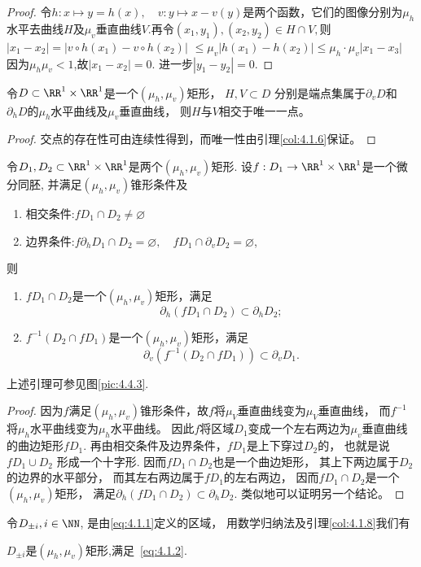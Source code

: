 \begin{proof}
  令$h:x \mapsto y=h(x), \quad v: y \mapsto x-v(y)$是两个函数，它们的图像分别为$\mu_h$水平去曲线$H$及$\mu_v$垂直曲线$V$.再令$(x_1,y_1),(x_2,y_2)\in H \cap V,$则
  $\left|x_{1}-x_{2}\right|=\left|v \circ h\left(x_{1}\right)-v \circ h\left(x_{2}\right)\right|$
  $\leqslant \mu_{v}\left|h\left(x_{1}\right)-h\left(x_{2}\right)\right| \leqslant \mu_{h} \cdot \mu_{v}\left|x_{1}-x_{3}\right|$
  因为$\mu_h\mu_v<1$,故$|x_1-x_2|=0$.
  进一步$|y_1-y_2|=0$.
\end{proof}

\begin{corollary}
  \label{col:4.1.7}
  令$D\subset \RR^1 \times \RR^1$是一个$(\mu_h,\mu_v)$矩形，
  $H,V\subset D$  分别是端点集属于$\partial_vD$和$\partial_hD$的$\mu_h$水平曲线及$\mu_v$垂直曲线，
  则$H$与$V$相交于唯一一点。
\end{corollary}
\begin{proof}
交点的存在性可由连续性得到，而唯一性由引理\ref{col:4.1.6}保证。
\end{proof}

\begin{corollary}
  \label{col:4.1.8}
  令$D_1,D_2 \subset\RR^1\times \RR^1$是两个$(\mu_h,\mu_v)$矩形.
  设$f:D_1\to \RR^1 \times \RR^1$是一个微分同胚,
  并满足$(\mu_h,\mu_v)$锥形条件及
  \begin{enumerate}
  \item 相交条件:$fD_1 \cap D_2 \ne \varnothing $
  \item 边界条件:$f \partial_{h} D_{1} \cap D_{2}=\varnothing, \quad
    f D_{1} \cap \partial_{v} D_{2}=\varnothing$,
  \end{enumerate}
  则
  \begin{enumerate}
  \item $ fD_1 \cap D_2$是一个$(\mu_h,\mu_v)$矩形，满足
$$
\partial_{h}\left(f D_{1} \cap D_{2}\right) \subset \partial_{h} D_{2};
$$
\item $f^{-1} (D_2 \cap fD_1)$是一个$(\mu_h,\mu_v)$矩形，满足
$$
\partial_{v}\left(f^{-1}\left(D_{2} \cap f D_{1}\right)\right) \subset \partial_{v} D_{1}.
$$
\end{enumerate}
\end{corollary}
上述引理可参见图\ref{pic:4.4.3}.

\begin{proof}
  因为$f$满足$(\mu_h,\mu_v)$锥形条件，故$f$将$\mu_V$垂直曲线变为$\mu_V$垂直曲线，
  而$f^{-1}$将$\mu_h$水平曲线变为$\mu_h$水平曲线。
  因此$f$将区域$D_1$变成一个左右两边为$\mu_v$垂直曲线的曲边矩形$fD_1$.
  再由相交条件及边界条件，$fD_1$是上下穿过$D_2$的，
  也就是说$fD_1\cup D_2$ 形成一个十字形.
  因而$fD_1\cap D_2$也是一个曲边矩形，
  其上下两边属于$D_2$的边界的水平部分，
  而其左右两边属于$fD_1$的左右两边，
  因而$fD_1 \cap D_2$是一个$(\mu_h,\mu_v)$矩形，
  满足$\partial_h (fD_1 \cap D_2) \subset \partial_h D_2$.
  类似地可以证明另一个结论。
\end{proof}
\par
令$D_{\pm i},i \in \NN$,
是由\eqref{eq:4.1.1}定义的区域，
用数学归纳法及引理\ref{col:4.1.8}我们有
\begin{corollary}
  \label{cor:4.1.9}
  $D_{\pm i}$是$(\mu_h,\mu_v)$矩形,满足~\ref{eq:4.1.2}.
\end{corollary}


